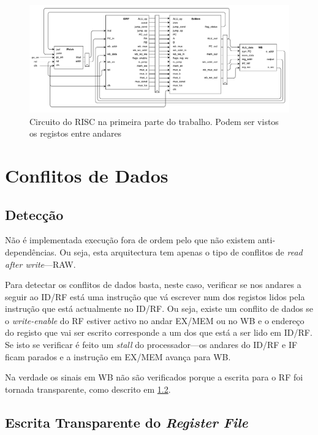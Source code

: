 \documentclass[a4paper]{article}
\begin{document}
		\begin{figure}[h]
			\centering
			\includegraphics[width=1.\textwidth]{img/circuit_pt1}
			\caption{Circuito do \textmu RISC na primeira parte do trabalho. Podem ser vistos os registos entre andares}
			\label{fig:circuit_pt1}
		\end{figure}
	
	\section{Conflitos de Dados}
	
	\subsection{Detecção}
	
	Não é implementada execução fora de ordem pelo que não existem anti-dependências. Ou seja, esta arquitectura tem apenas o tipo de conflitos de \textit{read after write}---RAW.
	
	Para detectar os conflitos de dados basta, neste caso, verificar se nos andares a seguir ao ID/RF está uma instrução que vá escrever num dos registos lidos pela instrução que está actualmente no ID/RF. Ou seja, existe um conflito de dados se o \textit{write-enable} do RF estiver activo no andar EX/MEM ou no WB e o endereço do registo que vai ser escrito corresponde a um dos que está a ser lido em ID/RF. Se isto se verificar é feito um \textit{stall} do processador---os andares do ID/RF e IF ficam parados e a instrução em EX/MEM avança para WB.
	
	Na verdade os sinais em WB não são verificados porque a escrita para o RF foi tornada transparente, como descrito em \ref{subsec:RF_write}.
	
	\subsection{Escrita Transparente do \textit{Register File}}
	\label{subsec:RF_write}
	
\end{document}
